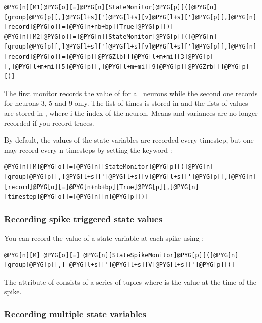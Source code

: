 \documentclass[letterpaper,10pt,english]{manual}
\begin{document}
\begin{Verbatim}[commandchars=@\[\]]
@PYG[n][M1]@PYG[o][=]@PYG[n][StateMonitor]@PYG[p][(]@PYG[n][group]@PYG[p][,]@PYG[l+s][']@PYG[l+s][v]@PYG[l+s][']@PYG[p][,]@PYG[n][record]@PYG[o][=]@PYG[n+nb+bp][True]@PYG[p][)]
@PYG[n][M2]@PYG[o][=]@PYG[n][StateMonitor]@PYG[p][(]@PYG[n][group]@PYG[p][,]@PYG[l+s][']@PYG[l+s][v]@PYG[l+s][']@PYG[p][,]@PYG[n][record]@PYG[o][=]@PYG[p][@PYGZlb[]]@PYG[l+m+mi][3]@PYG[p][,]@PYG[l+m+mi][5]@PYG[p][,]@PYG[l+m+mi][9]@PYG[p][@PYGZrb[]]@PYG[p][)]
\end{Verbatim}

The first monitor records the value of  for all neurons while the second one records  for
neurons 3, 5 and 9 only. The list of times is stored in  and the lists of values are stored in
, where i the index of the neuron. Means and variances are no longer recorded if you
record traces.

By default, the values of the state variables are recorded every timestep, but one may record every n timesteps
by setting the keyword :

\begin{Verbatim}[commandchars=@\[\]]
@PYG[n][M]@PYG[o][=]@PYG[n][StateMonitor]@PYG[p][(]@PYG[n][group]@PYG[p][,]@PYG[l+s][']@PYG[l+s][v]@PYG[l+s][']@PYG[p][,]@PYG[n][record]@PYG[o][=]@PYG[n+nb+bp][True]@PYG[p][,]@PYG[n][timestep]@PYG[o][=]@PYG[n][n]@PYG[p][)]
\end{Verbatim}


\subsubsection{Recording spike triggered state values}

You can record the value of a state variable at each spike using \hyperlink{brian.StateSpikeMonitor}{}:

\begin{Verbatim}[commandchars=@\[\]]
@PYG[n][M] @PYG[o][=] @PYG[n][StateSpikeMonitor]@PYG[p][(]@PYG[n][group]@PYG[p][,] @PYG[l+s][']@PYG[l+s][V]@PYG[l+s][']@PYG[p][)]
\end{Verbatim}

The  attribute of  consists of a series of tuples  where  is the
value at the time of the spike.


\subsubsection{Recording multiple state variables}
\end{document}
